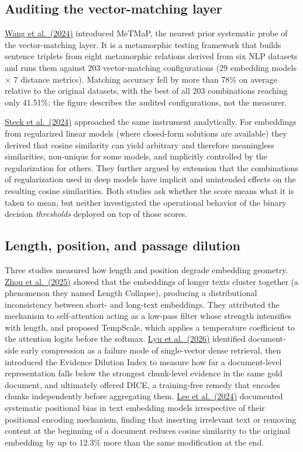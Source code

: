 \documentclass[11pt]{article}
\begin{document}
\subsection{Auditing the vector-matching layer}

\hyperlink{bib:wangmetmap}{Wang et al.\ (2024)} introduced MeTMaP, the nearest prior systematic probe of the vector-matching layer. It is a metamorphic testing framework that builds sentence triplets from eight metamorphic relations derived from six NLP datasets and runs them against 203 vector-matching configurations (29 embedding models $\times$ 7 distance metrics). Matching accuracy fell by more than 78\% on average relative to the original datasets, with the best of all 203 combinations reaching only 41.51\%; the figure describes the audited configurations, not the measurer.

\hyperlink{bib:steck}{Steck et al.\ (2024)} approached the same instrument analytically. For embeddings from regularized linear models (where closed-form solutions are available) they derived that cosine similarity can yield arbitrary and therefore meaningless similarities, non-unique for some models, and implicitly controlled by the regularization for others. They further argued by extension that the combinations of regularization used in deep models have implicit and unintended effects on the resulting cosine similarities. Both studies ask whether the score means what it is taken to mean, but neither investigated the operational behavior of the binary decision \emph{thresholds} deployed on top of those scores.

\subsection{Length, position, and passage dilution}

Three studies measured how length and position degrade embedding geometry. \hyperlink{bib:zhou}{Zhou et al.\ (2025)} showed that the embeddings of longer texts cluster together (a phenomenon they named Length Collapse), producing a distributional inconsistency between short- and long-text embeddings. They attributed the mechanism to self-attention acting as a low-pass filter whose strength intensifies with length, and proposed TempScale, which applies a temperature coefficient to the attention logits before the softmax. \hyperlink{bib:lyu}{Lyu et al.\ (2026)} identified document-side early compression as a failure mode of single-vector dense retrieval, then introduced the Evidence Dilution Index to measure how far a document-level representation falls below the strongest chunk-level evidence in the same gold document, and ultimately offered DICE, a training-free remedy that encodes chunks independently before aggregating them. \hyperlink{bib:lee}{Lee et al.\ (2024)} documented systematic positional bias in text embedding models irrespective of their positional encoding mechanism, finding that inserting irrelevant text or removing content at the beginning of a document reduces cosine similarity to the original embedding by up to 12.3\% more than the same modification at the end.
\end{document}
